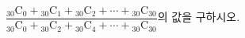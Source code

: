 $\dfrac{{}_{30}\mathrm{C}_0+{}_{30}\mathrm{C}_1+{}_{30}\mathrm{C}_2+\cdots+{}_{30}\mathrm{C}_{30}}{{}_{30}\mathrm{C}_0+{}_{30}\mathrm{C}_2+{}_{30}\mathrm{C}_4+\cdots+{}_{30}\mathrm{C}_{30}}$의 값을 구하시오.
